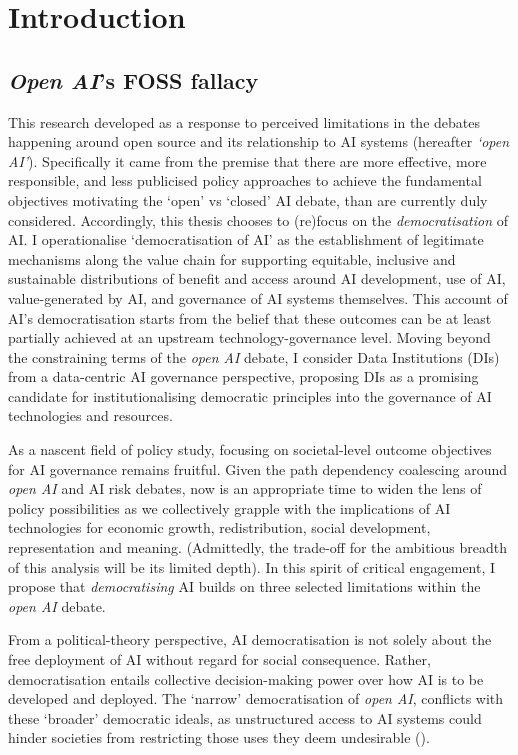 \chapter{Introduction}

\section*{\textit{Open AI}'s FOSS fallacy}

This research developed as a response to perceived limitations in the debates happening around open source and its relationship to AI systems (hereafter \textit{‘open AI’}). Specifically it came from the premise that there are more effective, more responsible, and less publicised policy approaches to achieve the fundamental objectives motivating the ‘open’ vs ‘closed’ AI debate, than are currently duly considered. Accordingly, this thesis chooses to (re)focus on the \textit{democratisation} of AI. I operationalise `democratisation of AI' as the establishment of legitimate mechanisms along the value chain for supporting equitable, inclusive and sustainable distributions of benefit and access around AI development, use of AI, value-generated by AI, and governance of AI systems themselves. This account of AI's democratisation starts from the belief that these outcomes can be at least partially achieved at an upstream technology-governance level. Moving beyond the constraining terms of the \textit{open AI} debate, I consider Data Institutions (DIs) from a data-centric AI governance perspective, proposing DIs as a promising candidate for institutionalising democratic principles into the governance of AI technologies and resources. 

As a nascent field of policy study, focusing on societal-level outcome objectives for AI governance remains fruitful. Given the path dependency coalescing around \textit{open AI} and AI risk debates, now is an appropriate time to widen the lens of policy possibilities as we collectively grapple with the implications of AI technologies for economic growth, redistribution, social development, representation and meaning. (Admittedly, the trade-off for the ambitious breadth of this analysis will be its limited depth). In this spirit of critical engagement, I propose that \textit{democratising} AI builds on three selected limitations within the \textit{open AI} debate.

From a political-theory perspective, AI democratisation is not solely about the free deployment of AI without regard for social consequence. Rather, democratisation entails collective decision-making power over how AI is to be developed and deployed. The ‘narrow’ democratisation of \textit{open AI}, conflicts with these `broader' democratic ideals, as unstructured access to AI systems could hinder societies from restricting those uses they deem undesirable (\cite{chan2023ReclaimingDigitalCommons}).

